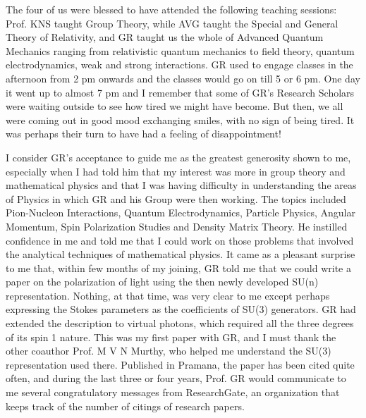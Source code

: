 The four of us were blessed to have attended the following teaching sessions: Prof. KNS taught Group Theory, while AVG taught the Special and General Theory of Relativity, and GR taught us the whole of Advanced Quantum Mechanics ranging from relativistic quantum mechanics to field theory, quantum electrodynamics, weak and strong interactions. GR used to engage classes in the afternoon from 2 pm onwards and the classes would go on till 5 or 6 pm. One day it went up to almost 7 pm and I remember that some of GR's Research Scholars were waiting outside to see how tired we might have become. But then, we all were coming out in good mood exchanging smiles, with no sign of being tired. It was perhaps their turn to have had a feeling of disappointment!

I consider GR's acceptance to guide me as the greatest generosity shown to me, especially when I had told him that my interest was more in group theory and mathematical physics and that I was having difficulty in understanding the areas of Physics in which GR and his Group were then working. The topics included Pion-Nucleon Interactions, Quantum Electrodynamics, Particle Physics, Angular Momentum, Spin Polarization Studies and Density Matrix Theory. He instilled confidence in me and told me that I could work on those problems that involved the analytical techniques of mathematical physics. It came as a pleasant surprise to me that, within few months of my joining, GR told me that we could write a paper on the polarization of light using the then newly developed SU(n) representation. Nothing, at that time, was very clear to me except perhaps expressing the Stokes parameters as the coefficients of SU(3) generators. GR had extended the description to virtual photons, which required all the three degrees of its spin 1 nature. This was my first paper with GR, and I must thank the other coauthor Prof. M V N Murthy, who helped me understand the SU(3) representation used there. Published in Pramana, the paper has been cited quite often, and during the last three or four years, Prof. GR would communicate to me several congratulatory messages from ResearchGate, an organization that keeps track of the number of citings of research papers.


